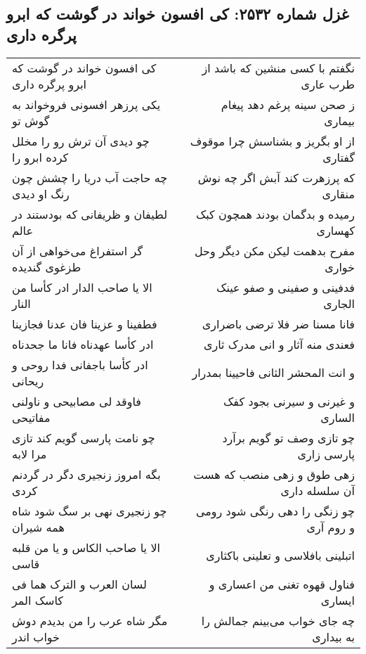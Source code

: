 \begin{center}
\section*{غزل شماره ۲۵۳۲: کی افسون خواند در گوشت که ابرو پرگره داری}
\label{sec:2532}
\begin{longtable}{l p{0.5cm} r}
کی افسون خواند در گوشت که ابرو پرگره داری
&&
نگفتم با کسی منشین که باشد از طرب عاری
\\
یکی پرزهر افسونی فروخواند به گوش تو
&&
ز صحن سینه پرغم دهد پیغام بیماری
\\
چو دیدی آن ترش رو را مخلل کرده ابرو را
&&
از او بگریز و بشناسش چرا موقوف گفتاری
\\
چه حاجت آب دریا را چشش چون رنگ او دیدی
&&
که پرزهرت کند آبش اگر چه نوش منقاری
\\
لطیفان و ظریفانی که بودستند در عالم
&&
رمیده و بدگمان بودند همچون کبک کهساری
\\
گر استفراغ می‌خواهی از آن طزغوی گندیده
&&
مفرح بدهمت لیکن مکن دیگر وحل خواری
\\
الا یا صاحب الدار ادر کأسا من النار
&&
فدفینی و صفینی و صفو عینک الجاری
\\
فطفینا و عزینا فان عدنا فجازینا
&&
فانا مسنا ضر فلا ترضی باضراری
\\
ادر کأسا عهدناه فانا ما جحدناه
&&
فعندی منه آثار و انی مدرک ثاری
\\
ادر کأسا باجفانی فدا روحی و ریحانی
&&
و انت المحشر الثانی فاحیینا بمدرار
\\
فاوقد لی مصابیحی و ناولنی مفاتیحی
&&
و غیرنی و سیرنی بجود کفک الساری
\\
چو نامت پارسی گویم کند تازی مرا لابه
&&
چو تازی وصف تو گویم برآرد پارسی زاری
\\
بگه امروز زنجیری دگر در گردنم کردی
&&
زهی طوق و زهی منصب که هست آن سلسله داری
\\
چو زنجیری نهی بر سگ شود شاه همه شیران
&&
چو زنگی را دهی رنگی شود رومی و روم آری
\\
الا یا صاحب الکاس و یا من قلبه قاسی
&&
اتبلینی بافلاسی و تعلینی باکثاری
\\
لسان العرب و الترک هما فی کاسک المر
&&
فناول قهوه تغنی من اعساری و ایساری
\\
مگر شاه عرب را من بدیدم دوش خواب اندر
&&
چه جای خواب می‌بینم جمالش را به بیداری
\\
\end{longtable}
\end{center}

